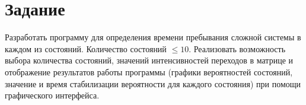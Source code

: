 \chapter*{Задание}

Разработать программу для определения времени пребывания сложной системы в каждом из состояний. Количество состояний $\le 10$. Реализовать возможность выбора количества состояний, значений интенсивностей переходов в матрице и отображение результатов работы программы (графики вероятностей состояний, значение и время стабилизации вероятности для каждого состояния) при помощи графического интерфейса.